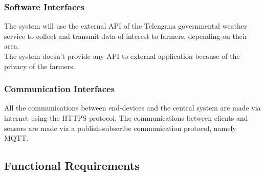 \documentclass[10pt]{article}
\begin{document}
\subsubsection{Software Interfaces}
The system will use the external API of the Telengana governmental weather service to collect and transmit data of interest to farmers, depending on their area.\\
The system doesn't provide any API to external application because of the privacy of the farmers.
\subsubsection{Communication Interfaces}
All the communications between end-devices and the central system are made via internet using the HTTPS protocol.
The communications between clients and sensors are made via a publish-subscribe communication protocol, namely MQTT.
\subsection{Functional Requirements}
\end{document}
